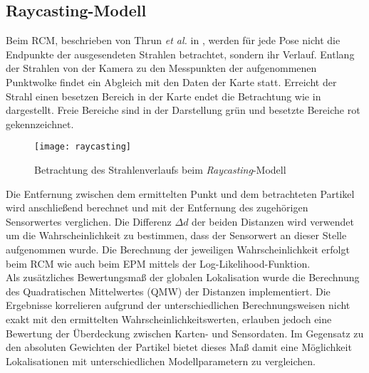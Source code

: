 \subsection{Raycasting-Modell}
Beim RCM, beschrieben von Thrun \textit{et al.} in \cite{Thrun2005}, werden für jede Pose nicht die Endpunkte der ausgesendeten Strahlen betrachtet, sondern ihr Verlauf. Entlang der Strahlen von der Kamera zu den Messpunkten der aufgenommenen Punktwolke findet ein Abgleich mit den Daten der Karte statt. Erreicht der Strahl einen besetzen Bereich in der Karte endet die Betrachtung wie in  dargestellt. Freie Bereiche sind in der Darstellung grün und besetzte Bereiche rot gekennzeichnet.

\begin{figure}[!ht]
	\begin{center}
		\texttt{[image: raycasting]}
		\caption{Betrachtung des Strahlenverlaufs beim \textit{Raycasting}-Modell}
		\label{fig.raycast}
	\end{center}
\end{figure}


Die Entfernung zwischen dem ermittelten Punkt und dem betrachteten Partikel wird anschließend berechnet und mit der Entfernung des zugehörigen Sensorwertes verglichen. Die Differenz $\Delta d$ der beiden Distanzen wird verwendet um die Wahrscheinlichkeit zu bestimmen, dass der Sensorwert an dieser Stelle aufgenommen wurde. Die Berechnung der jeweiligen Wahrscheinlichkeit erfolgt beim RCM wie auch beim EPM mittels der Log-Likelihood-Funktion.\\

Als zusätzliches Bewertungsmaß der globalen Lokalisation wurde die Berechnung des Quadratischen Mittelwertes (QMW) der Distanzen implementiert. Die Ergebnisse korrelieren aufgrund der unterschiedlichen Berechnungsweisen nicht exakt mit den ermittelten Wahrscheinlichkeitswerten, erlauben jedoch eine Bewertung der Überdeckung zwischen Karten- und Sensordaten. Im Gegensatz zu den absoluten Gewichten der Partikel bietet dieses Maß damit eine Möglichkeit Lokalisationen mit unterschiedlichen Modellparametern zu vergleichen.



